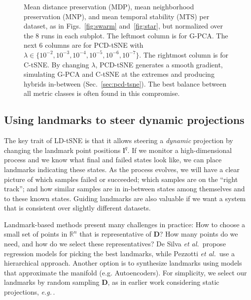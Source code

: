 \begin{figure}[htb!]
 \caption{
Mean distance preservation (MDP), mean neighborhood preservation (MNP), and mean temporal stability (MTS) per dataset, as in Figs.~\ref{fig:swarm} and~\ref{fig:star}, but normalized over the 8 runs in each subplot.
  The leftmost column is for G-PCA. The next 6 columns are for PCD-tSNE with $\lambda \in \{10^{-2}, 10^{-3}, 10^{-4}, 10^{-5}, 10^{-6}, 10^{-7}\}$. The rightmost column is for C-tSNE.
  By changing $\lambda$, PCD-tSNE generates a smooth gradient, simulating G-PCA and C-tSNE at the extremes and producing hybrids in-between (Sec.~\ref{sec:pcd-tsne}). The best balance between all metric classes is often found in this compromise.}
  \vspace{-0.5cm}
 \label{fig:lambda}
\end{figure}



\subsection{Using landmarks to steer dynamic projections} 
\label{sec:landmark-placement}
%
The key trait of LD-tSNE is that it allows steering a \emph{dynamic} projection by changing the landmark point positions $\mathbf{l}^q$. If we monitor a high-dimensional process and we know what final and failed states look like, we can place landmarks indicating these states. As the process evolves, we will have a clear picture of which samples failed or succeeded; which samples are on the ``right track''; and how similar samples are in in-between states among themselves and to these known states. Guiding landmarks are also valuable if we want a system that is consistent over slightly different datasets. 

Landmark-based methods present many challenges in practice: How to choose a small set of points in $\mathbb{R}^n$ that is representative of $\mathbf{D}$? How many points do we need, and how do we select these representatives? De Silva \emph{et al.}\,\cite{DeSilva2005} propose regression models for picking the best landmarks, while Pezzotti \emph{et al.}\,\cite{Pezzotti2016} use a hierarchical approach. Another option is to synthesize landmarks using models that approximate the manifold (e.g. Autoencoders). For simplicity, we select our landmarks by random sampling $\mathbf{D}$, as in earlier work considering static projections, \emph{e.g.}\,\cite{Joia2011,Pekalska1999}.

